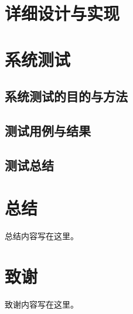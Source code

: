 \documentclass[12pt,a4paper]{article}%
\begin{document}
\newpage

\section{详细设计与实现}

\newpage

\section{系统测试}
\subsection{系统测试的目的与方法}
\subsection{测试用例与结果}
\subsection{测试总结}

\section*{总结}%
总结内容写在这里。

\section*{致谢}
致谢内容写在这里。
\end{document}
